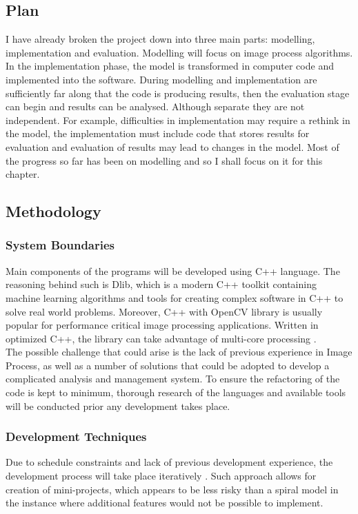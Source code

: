 \begin{itemize}
\section{Plan}
I have already broken the project down into three main parts: modelling, implementation and evaluation. Modelling will focus on image process algorithms. In the implementation phase, the model is transformed in computer code and implemented into the software. During modelling and implementation are sufficiently far along that the code is producing results, then the evaluation stage can begin and results can be
analysed. Although separate they are not independent. For example, difficulties in implementation may require a rethink in the model, the implementation must include code that stores results for evaluation and evaluation of results may lead to changes in the model. Most of the progress so far has been on modelling and so I shall focus on it for this chapter.
\subsection{Methodology}
\subsubsection{System Boundaries}

Main components of the programs will be developed using C++ language. The reasoning behind such is Dlib, which is a modern C++ toolkit containing machine learning algorithms and tools for creating complex software in C++ to solve real world problems\cite{dlib}. Moreover, C++ with OpenCV library is usually popular for performance critical image processing applications. Written in optimized C++, the library can take advantage of multi-core processing \cite{opencv}.\\

The possible challenge that could arise is the lack of previous experience in Image Process, as well as a number of solutions that could be adopted to develop a complicated analysis and management system. To ensure the refactoring of the code is kept to minimum, thorough research of the languages and available tools will be conducted prior any development takes place.

\subsubsection{Development Techniques}

Due to schedule constraints and lack of previous development experience, the development
process will take place iteratively \cite{Change}. Such approach allows for creation of mini-projects, which appears to be less risky than a spiral model in the instance where additional features would not be possible to implement.\\


\end{itemize}
